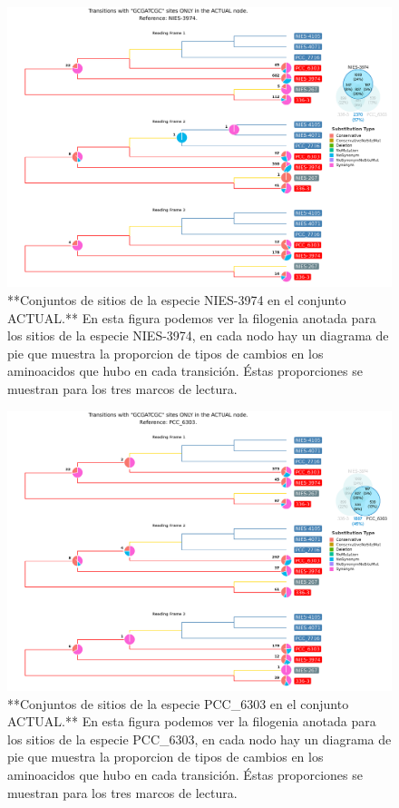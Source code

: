 \documentclass[
]{book}
\begin{document}
\begin{figure}

{\centering \includegraphics[width=1.2\linewidth]{Clados/Calothrix_B/figures/A/GCGATCGC/Actual/NIES-3974_Actual_A_tree} 

}

\caption{**Conjuntos de sitios de la especie NIES-3974 en el conjunto ACTUAL.** En esta figura podemos ver la filogenia anotada para los sitios de la especie NIES-3974, en cada nodo hay un diagrama de pie que muestra la proporcion de tipos de cambios en los aminoacidos que hubo en cada transición. Éstas proporciones se muestran para los tres marcos de lectura.}\label{fig:FIG10}
\end{figure}

\begin{figure}

{\centering \includegraphics[width=1.2\linewidth]{Clados/Calothrix_B/figures/A/GCGATCGC/Actual/PCC_6303_Actual_A_tree} 

}

\caption{**Conjuntos de sitios de la especie PCC\_6303 en el conjunto ACTUAL.** En esta figura podemos ver la filogenia anotada para los sitios de la especie PCC\_6303, en cada nodo hay un diagrama de pie que muestra la proporcion de tipos de cambios en los aminoacidos que hubo en cada transición. Éstas proporciones se muestran para los tres marcos de lectura.}\label{fig:FIG11}
\end{figure}
\end{document}
